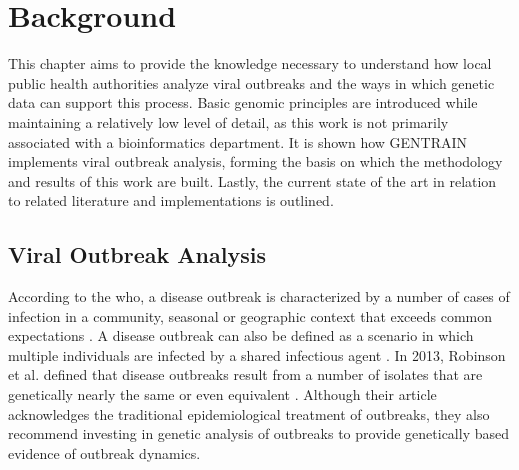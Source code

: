 \section{Background}
\label{cha:background}
This chapter aims to provide the knowledge necessary to understand how local public health authorities analyze viral outbreaks and the ways in which genetic data can support this process. Basic genomic principles are introduced while maintaining a relatively low level of detail, as this work is not primarily associated with a bioinformatics department. It is shown how GENTRAIN implements viral outbreak analysis, forming the basis on which the methodology and results of this work are built. Lastly, the current state of the art in relation to related literature and implementations is outlined.

\subsection{Viral Outbreak Analysis}
\label{sec:viral_outbreak_analysis}
According to the \acrfull{who}, a disease outbreak is characterized by a number of cases of infection in a community, seasonal or geographic context that exceeds common expectations \cite{Who1}. A disease outbreak can also be defined as a scenario in which multiple individuals are infected by a shared infectious agent \cite{Cdc1}. In 2013, Robinson et al. defined that disease outbreaks result from a number of isolates that are genetically nearly the same or even equivalent \cite{Rob1}.
Although their article acknowledges the traditional epidemiological treatment of outbreaks, they also recommend investing in genetic analysis of outbreaks to provide genetically based evidence of outbreak dynamics. 

